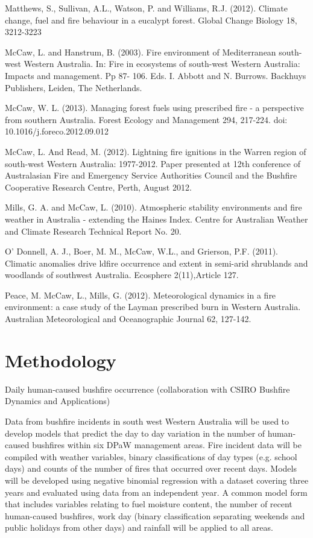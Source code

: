 \documentclass[version=last, paper=a4, DIV=18, usenames, dvipsnames]{scrartcl}
\begin{document}
Matthews, S., Sullivan, A.L., Watson, P. and Williams, R.J. (2012). Climate change, fuel and fire behaviour in a eucalypt forest. Global Change Biology 18, 3212-3223


McCaw, L. and Hanstrum, B. (2003). Fire environment of Mediterranean south-west Western Australia. In: Fire in ecosystems of south-west Western Australia: Impacts and management. Pp 87- 106. Eds. I. Abbott and N. Burrows. Backhuys Publishers, Leiden, The Netherlands.


McCaw, W. L. (2013). Managing forest fuels using prescribed fire - a perspective from southern Australia. Forest Ecology and Management 294, 217-224. doi: 10.1016/j.foreco.2012.09.012


McCaw, L. And Read, M. (2012). Lightning fire ignitions in the Warren region of south-west Western Australia: 1977-2012. Paper presented at 12th conference of Australasian Fire and Emergency Service Authorities Council and the Bushfire Cooperative Research Centre, Perth, August 2012.


Mills, G. A. and McCaw, L. (2010). Atmospheric stability environments and fire weather in Australia - extending the Haines Index. Centre for Australian Weather and Climate Research Technical Report No. 20.


O' Donnell, A. J., Boer, M. M., McCaw, W.L., and Grierson, P.F. (2011). Climatic anomalies drive ldfire occurrence and extent in semi-arid shrublands and woodlands of southwest Australia. Ecosphere 2(11),Article 127.


Peace, M. McCaw, L., Mills, G. (2012). Meteorological dynamics in a fire environment: a case study of the Layman prescribed burn in Western Australia. Australian Meteorological and Oceanographic Journal 62, 127-142.







\section{Methodology}



Daily human-caused bushfire occurrence (collaboration with CSIRO Bushfire Dynamics and    Applications)


Data from bushfire incidents in south west Western Australia will be used to develop models that  predict the day to day variation in the number of human-caused bushfires within six DPaW  management areas.  Fire incident data will be compiled with weather variables, binary classifications   of day types (e.g. school days) and counts of the number of fires that occurred over recent days.  Models will be developed using negative binomial regression with a dataset covering three years and evaluated using data from an independent year. A common model form that includes variables relating  to fuel moisture content, the number of recent human-caused bushfires, work day (binary classification separating weekends and public holidays from other days) and rainfall will be applied to all areas.
\end{document}
